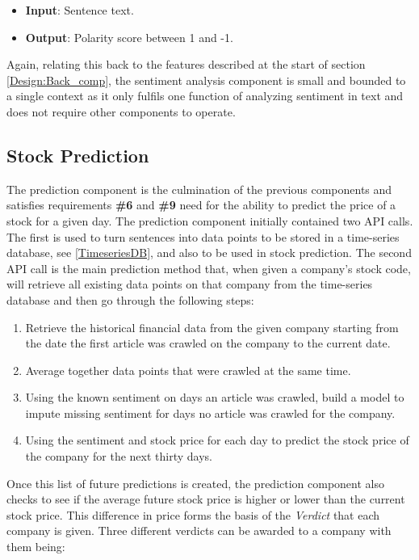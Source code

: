         \begin{itemize}
            \item \textbf{Input}: Sentence text.
            \item \textbf{Output}: Polarity score between 1 and -1.
        \end{itemize}
        
        Again, relating this back to the features described at the start of section \ref{Design:Back_comp}, the sentiment analysis component is small and bounded to a single context as it only fulfils one function of analyzing sentiment in text and does not require other components to operate. 
        
        \subsection{Stock Prediction}
        \label{prediction}
        The prediction component is the culmination of the previous components and satisfies requirements \textbf{\#6} and \textbf{\#9} need for the ability to predict the price of a stock for a given day. The prediction component initially contained two API calls. The first is used to turn sentences into data points to be stored in a time-series database, see \ref{TimeseriesDB}, and also to be used in stock prediction. The second API call is the main prediction method that, when given a company's stock code, will retrieve all existing data points on that company from the time-series database and then go through the following steps:
        
        \begin{enumerate}
            \item Retrieve the historical financial data from the given company starting from the date the first article was crawled on the company to the current date.
            \item Average together data points that were crawled at the same time.
            \item Using the known sentiment on days an article was crawled, build a model to impute missing sentiment for days no article was crawled for the company.
            \item Using the sentiment and stock price for each day to predict the stock price of the company for the next thirty days.
        \end{enumerate}
        
        Once this list of future predictions is created, the prediction component also checks to see if the average future stock price is higher or lower than the current stock price. This difference in price forms the basis of the \textit{Verdict} that each company is given. Three different verdicts can be awarded to a company with them being:
        
